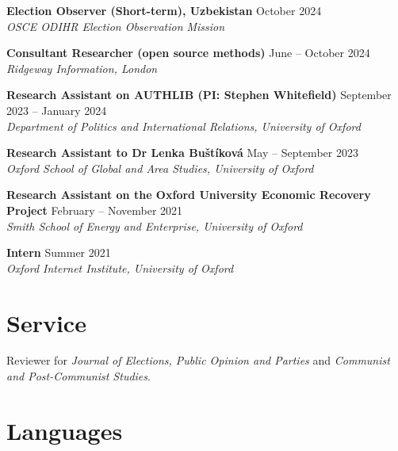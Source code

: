 \documentclass[10pt, a4paper]{article}
\begin{document}
\begin{samepage}
  \textbf{Election Observer (Short-term), Uzbekistan} \hfill October 2024\\
  \textit{OSCE ODIHR Election Observation Mission}
\end{samepage}

\begin{samepage}
  \textbf{Consultant Researcher (open source methods)} \hfill June -- October 2024\\
  \textit{Ridgeway Information, London}
\end{samepage}

\begin{samepage}
  \textbf{Research Assistant on AUTHLIB (PI: Stephen Whitefield)} \hfill September 2023 -- January 2024\\
  \textit{Department of Politics and International Relations, University of Oxford}
\end{samepage}

\begin{samepage}
  \textbf{Research Assistant to Dr Lenka Buštíková} \hfill May -- September 2023\\
  \textit{Oxford School of Global and Area Studies, University of Oxford}
\end{samepage}

\begin{samepage}
  \textbf{Research Assistant on the Oxford University Economic Recovery Project} \hfill February -- November 2021\\
  \textit{Smith School of Energy and Enterprise, University of Oxford}
\end{samepage}

\begin{samepage}
  \textbf{Intern} \hfill Summer 2021\\
  \textit{Oxford Internet Institute, University of Oxford}
\end{samepage}

\section{Service}

Reviewer for \textit{Journal of Elections, Public Opinion and Parties} and \textit{Communist and Post-Communist Studies}.

\section{Languages}
\end{document}
